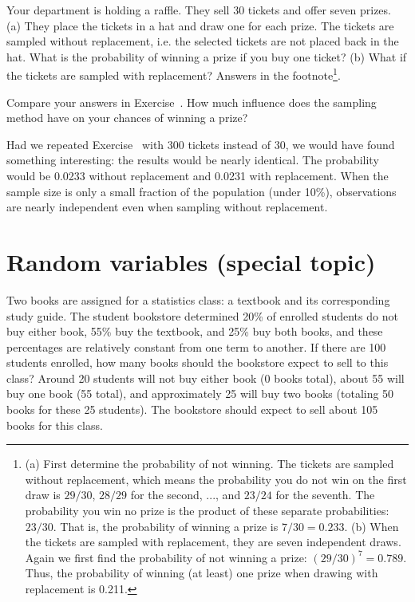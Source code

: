 \begin{exercise} \label{raffleOf30TicketsWWOReplacement}
Your department is holding a raffle. They sell 30 tickets and offer seven prizes. (a) They place the tickets in a hat and draw one for each prize. The tickets are sampled without replacement, i.e. the selected tickets are not placed back in the hat. What is the probability of winning a prize if you buy one ticket? (b) What if the tickets are sampled with replacement? Answers in the footnote\footnote{(a) First determine the probability of not winning. The tickets are sampled without replacement, which means the probability you do not win on the first draw is $29/30$, $28/29$ for the second, ..., and $23/24$ for the seventh. The probability you win no prize is the product of these separate probabilities: $23/30$. That is, the probability of winning a prize is $7/30 = 0.233$. (b) When the tickets are sampled with replacement, they are seven independent draws. Again we first find the probability of not winning a prize: $(29/30)^7 = 0.789$. Thus, the probability of winning (at least) one prize when drawing with replacement is 0.211.}.
\end{exercise}

\begin{exercise} \label{followUpToRaffleOf30TicketsWWOReplacement}
Compare your answers in Exercise~. How much influence does the sampling method have on your chances of winning a prize?
\end{exercise}

Had we repeated Exercise~ with 300 tickets instead of 30, we would have found something interesting: the results would be nearly identical. The probability would be 0.0233 without replacement and 0.0231 with replacement. When the sample size is only a small fraction of the population (under 10\%), observations are nearly independent even when sampling without replacement.

\section{Random variables (special topic)}
\label{randomVariablesSection}

\begin{example}{Two books are assigned for a statistics class: a textbook and its corresponding study guide. The student bookstore determined 20\% of enrolled students do not buy either book, 55\% buy the textbook, and 25\% buy both books, and these percentages are relatively constant from one term to another. If there are 100 students enrolled, how many books should the bookstore expect to sell to this class?}\label{bookStoreSales}
Around 20 students will not buy either book (0 books total), about 55 will buy one book (55 total), and approximately 25 will buy two books (totaling 50 books for these 25 students). The bookstore should expect to sell about 105 books for this class.
\end{example}

